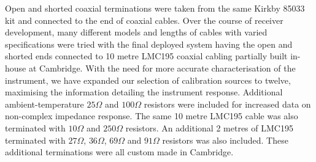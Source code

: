 Open and shorted coaxial terminations were taken from the same Kirkby 85033 kit and connected to the end of coaxial cables. Over the course of receiver development, many different models and lengths of cables with varied specifications were tried with the final deployed system having the open and shorted ends connected to 10 metre LMC195 coaxial cabling partially built in-house at Cambridge. With the need for more accurate characterisation of the instrument, we have expanded our selection of calibration sources to twelve, maximising the information detailing the instrument response. Additional ambient-temperature $25 \Omega$ and $100 \Omega$ resistors were included for increased data on non-complex impedance response. The same 10 metre LMC195 cable was also terminated with $10 \Omega$ and $250 \Omega$ resistors. An additional 2 metres of LMC195 terminated with $27 \Omega$, $36 \Omega$, $69 \Omega$ and $91 \Omega$ resistors was also included. These additional terminations were all custom made in Cambridge.


